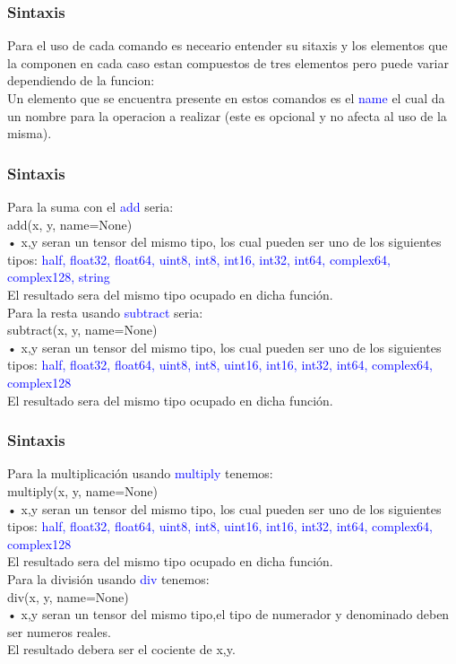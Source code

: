 \documentclass{beamer}
\begin{document}
\newpage
\begin{frame}\frametitle{Sintaxis}
Para el uso de cada comando es neceario entender su sitaxis y los
elementos que la componen en cada caso estan compuestos de tres
elementos pero puede variar dependiendo de la funcion:\\
\vspace{5mm}
Un elemento que se encuentra presente en estos comandos es el
\textcolor{blue}{name} el cual da un nombre para la operacion a realizar (este es
opcional y no afecta al uso de la misma).
\end{frame}

\newpage
\begin{frame}\frametitle{Sintaxis}
\begin{footnotesize}
Para la suma con el \textcolor{blue}{add} seria:\\
add(x, y, name=None)\\ \vspace{2.5mm}
• x,y seran un tensor del mismo tipo, los cual pueden ser uno de los siguientes
tipos: \textcolor{blue}{half, float32, float64, uint8, int8, int16, int32, int64, complex64,
complex128, string}\\
El resultado sera del mismo tipo ocupado en dicha función.\\ \vspace{5mm}
Para la resta usando \textcolor{blue}{subtract} seria:\\
subtract(x, y, name=None)\\ \vspace{2.5mm}
• x,y seran un tensor del mismo tipo, los cual pueden ser uno de los siguientes
tipos: \textcolor{blue}{half, float32, float64, uint8, int8, uint16, int16, int32, int64, complex64,
complex128}\\
El resultado sera del mismo tipo ocupado en dicha función.
\end{footnotesize}
\end{frame}

\newpage
\begin{frame}\frametitle{Sintaxis}
\begin{footnotesize}
Para la multiplicación usando \textcolor{blue}{multiply} tenemos:\\
multiply(x, y, name=None)\\ \vspace{2.5mm}
• x,y seran un tensor del mismo tipo, los cual pueden ser uno de los siguientes
tipos: \textcolor{blue}{half, float32, float64, uint8, int8, uint16, int16, int32, int64, complex64,
complex128}\\
El resultado sera del mismo tipo ocupado en dicha función.\\ \vspace{5mm}
Para la división usando \textcolor{blue}{div} tenemos:\\
div(x, y, name=None)\\ \vspace{2.5mm}
• x,y seran un tensor del mismo tipo,el tipo de numerador y denominado deben
ser numeros reales.\\
El resultado debera ser el cociente de x,y.
\end{footnotesize}
\end{frame}
\end{document}
